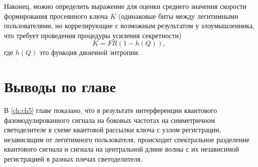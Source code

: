 Наконец, можно определить выражение для оценки среднего значения скорости формирования просеянного ключа $K$ (одинаковые биты между легитимными пользователями, но коррелирующие с возможным результатом у злоумышленника, что требует проведения процедуры усиления секретности)
\begin{equation}
    K=FR(1-h(Q)),
\end{equation}
где $h(Q)$ это функция двоичной энтропии. 

\pagebreak

\section{Выводы по главе} \label{ch:ch5/sec9}


В \ref{ch:ch5} главе показано, что в результате интерференции квантового фазомодулированного сигнала на боковых частотах на симметричном светоделителе в схеме квантовой рассылки ключа с узлом регистрации, независящим от легитимного пользователя, происходит спектральное разделение квантового сигнала и сигнала на центральной длине волны с их независимой регистрацией в разных плечах светоделителя. 

\pagebreak

